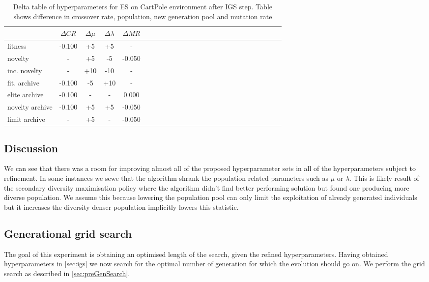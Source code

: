 \begin{table}[ht]
	\centering
	\scriptsize
	\setlength{\tabcolsep}{4pt}
	\renewcommand{\arraystretch}{1.15}
	\begin{tabular}{lcccccccccccccccccccccccc}
		\toprule
		{} &     $\Delta{CR}$ &   $\Delta{\mu}$ &   $\Delta{\lambda}$ &     $\Delta{MR}$ \\
		\midrule
		fitness           & -0.100 &   +5 &   +5 &  - \\
		novelty           &  - &   +5 &  -5 & -0.050 \\
		inc. novelty       &  - &  +10 & -10 &  - \\
		fit. archive     & -0.100 &  -5 &  +10 &  - \\
		elite archive   & -0.100 &   - &   - &  0.000 \\
		novelty archive & -0.100 &   +5 &   +5 & -0.050 \\
		limit archive     &  - &   +5 &   - & -0.050 \\
		\bottomrule
	\end{tabular}
	
	\caption{Delta table of hyperparameters for ES on CartPole environment after IGS step. Table shows difference in crossover rate, population, new generation pool and mutation rate}
	\label{tab:deltaCT2}
\end{table}
\subsection{Discussion}
We can see that there was a room for improving almost all of the proposed hyperparameter sets in all of the hyperparameters subject to refinement. In some instances we sewe that the algorithm shrank the population related parameters such as $\mu$ or $\lambda$. This is likely result of the secondary diversity maximisation policy where the algorithm didn't find better performing solution but found one producing more diverse population. We assume this because lowering the population pool can only limit the exploitation of already generated individuals but it increases the diversity denser population implicitly lowers this statistic.
 
\subsection{Generational grid search}
\label{sec:generationsExperiment}
The goal of this experiment is obtaining an optimised length of the search, given the refined hyperparameters. 
Having obtained hyperparameters in \cref{sec:igs} we now search for the optimal number of generation for which the evolution should go on.  We perform the grid search as described in \cref{sec:preGenSearch}. 

